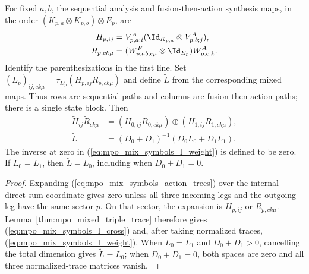 \begin{lemma}
    \label{thm:mpo_mixed_l_symbols}
    \leanok
    For fixed $a,b$, the sequential analysis and fusion-then-action
    synthesis maps, in the order $(K_{p,a}\otimes K_{p,b})\otimes E_p$,
    are
    \begin{align}
        H_{p,ij}    & =V^A_{p,a;i}(\Id_{K_{p,a}}\otimes V^A_{p,b;j}),
        \label{eq:mpo_mix_symbols_action_trees}                       \\
        R_{p,ck\mu} & =(W^F_{p,ab;c\mu}\otimes\Id_{E_p})W^A_{p,c;k}.
        \notag
    \end{align}
    Identify the parenthesizations in the first line.
    Set $(L_p)_{ij,ck\mu}=\tau_{D_p}(H_{p,ij}R_{p,ck\mu})$
    and define $\widetilde L$ from the corresponding mixed maps.
    Thus rows are sequential paths and columns are fusion-then-action
    paths; there is a single state block. Then
    \begin{align}
        \widetilde H_{ij}\widetilde R_{ck\mu}
         & =(H_{0,ij}R_{0,ck\mu})\oplus(H_{1,ij}R_{1,ck\mu}),
        \label{eq:mpo_mix_symbols_l_cross}                    \\
        \widetilde L
         & =(D_0+D_1)^{-1}(D_0L_0+D_1L_1).
        \label{eq:mpo_mix_symbols_l_weight}
    \end{align}
    The inverse at zero in (\ref{eq:mpo_mix_symbols_l_weight}) is
    defined to be zero. If $L_0=L_1$, then $\widetilde L=L_0$,
    including when $D_0+D_1=0$.
\end{lemma}
\begin{proof}
    \leanok
    Expanding (\ref{eq:mpo_mix_symbols_action_trees}) over the internal
    direct-sum coordinate gives zero unless all three incoming legs
    and the outgoing leg have the same sector $p$. On that sector,
    the expansion is $H_{p,ij}$ or $R_{p,ck\mu}$.
    Lemma~\ref{thm:mpo_mixed_triple_trace} therefore gives
    (\ref{eq:mpo_mix_symbols_l_cross}) and, after taking normalized
    traces, (\ref{eq:mpo_mix_symbols_l_weight}). When $L_0=L_1$ and
    $D_0+D_1>0$, cancelling the total dimension gives $\widetilde L=L_0$;
    when $D_0+D_1=0$, both spaces are zero and all three normalized-trace
    matrices vanish.
\end{proof}

